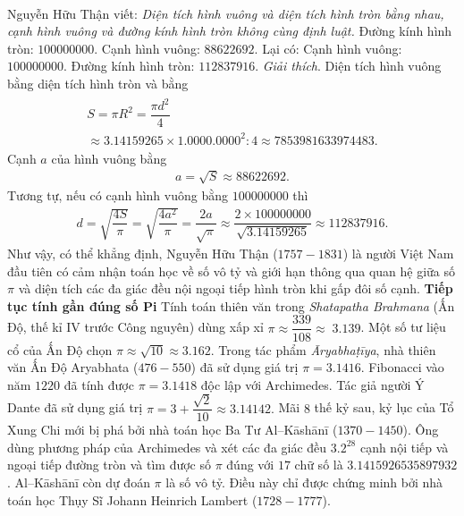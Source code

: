 \begin{multicols}{2}
\begin{align*}
	\end{align*}
	Nguyễn Hữu Thận viết:  \textit{Diện tích hình vuông và diện tích hình tròn bằng nhau, cạnh hình vuông và đường kính hình tròn không cùng định luật.}
	\vskip 0.1cm
	Đường kính hình tròn: $100000000$.
	\vskip 0.1cm 
	Cạnh hình vuông: $88622692$.
	\vskip 0.1cm
	Lại có: 
	\vskip 0.1cm
	Cạnh hình vuông: $100000000$.
	\vskip 0.1cm 
	Đường kính hình tròn: $112837916$.
	\vskip 0.1cm
	\textit{Giải thích}. Diện tích hình vuông bằng diện tích hình tròn và bằng 
	\begin{align*}
		\begin{array}{l}
			S = \pi {R^2} = \dfrac{{\pi {d^2}}}{4}\\
			\approx 3.14159265 \times {1.0000.0000^2}:4 \approx 7853981633974483.
		\end{array}
	\end{align*}
	Cạnh $a$ của hình vuông bằng
	\begin{align*}
		a = \sqrt S  \approx 88622692.
	\end{align*}
	Tương tự, nếu có cạnh hình vuông bằng $100000000$ thì  
	\begin{align*}
		d = \sqrt {\dfrac{{4S}}{\pi }}  = \sqrt {\dfrac{{4{a^2}}}{\pi }}  = \dfrac{{2a}}{{\sqrt \pi  }} \approx \dfrac{{2 \times 100000000}}{{\sqrt {3.14159265} }} \approx 112837916.
	\end{align*}
	Như vậy, có thể khẳng định, Nguyễn Hữu Thận ($1757-1831$) là người Việt Nam đầu tiên có cảm nhận toán học về số vô tỷ và giới hạn thông qua quan hệ giữa số $\pi$ và diện tích các đa giác đều nội ngoại tiếp hình tròn khi gấp đôi số cạnh.
	\vskip 0.1cm
	\textbf{\color{lichsutoanhoc}Tiếp tục tính gần đúng số Pi}
	\vskip 0.1cm
	Tính toán thiên văn trong \textit{Shatapatha Brahmana} (Ấn Độ, thế kỉ IV trước Công nguyên) dùng xấp xỉ $\pi  \approx \dfrac{{339}}{{108}} \approx \;3.139$.  Một số tư liệu cổ của Ấn Độ chọn $\pi  \approx \sqrt {10}  \approx 3.162$. Trong tác phẩm \textit{Āryabhaṭīya}, nhà thiên văn Ấn Độ Aryabhata ($476-550$) đã sử dụng giá trị $\pi  = 3.1416$.
	\vskip 0.1cm 
	Fibonacci vào năm $1220$ đã tính được $\pi  = 3.1418$  độc lập với Archimedes. 
	\vskip 0.1cm
	Tác giả người Ý Dante đã sử dụng giá trị  $\pi  = 3 + \dfrac{{\sqrt 2 }}{{10}} \approx 3.14142.$
	\vskip 0.1cm 
	Mãi $8$ thế kỷ sau, kỷ lục của Tổ Xung Chi mới bị phá bởi nhà toán học Ba Tư Al--Kāshānī ($1370-1450$). Ông dùng phương pháp của Archimedes và xét các đa giác đều $3.2^{28}$ cạnh nội tiếp và ngoại tiếp đường tròn và tìm được số $\pi$ đúng với $17$ chữ số là $3.1415926535897932$.  Al--Kāshānī còn dự đoán $\pi$ là số vô tỷ. Điều này chỉ được chứng minh bởi nhà toán học Thụy Sĩ Johann Heinrich Lambert ($1728 - 1777$).

\end{multicols}
